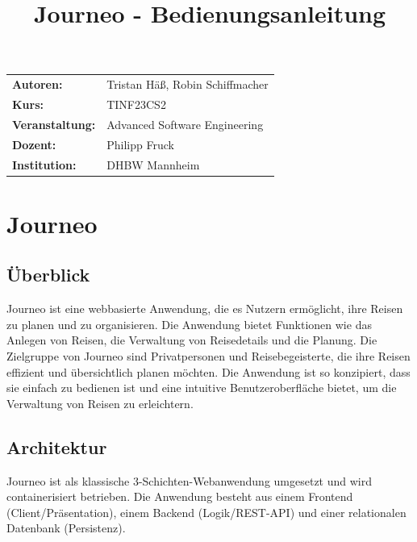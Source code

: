 \documentclass[12pt,a4paper]{article}
\title{\textbf{Journeo - Bedienungsanleitung}}
\date{}
\begin{document}
\maketitle
\thispagestyle{empty}
\onehalfspacing

\begin{center}
    \begin{tabular}{@{}ll@{}}
        \textbf{Autoren:} & Tristan Häß, Robin Schiffmacher\\[1cm]
        \textbf{Kurs:}         & TINF23CS2 \\[1cm]
        \textbf{Veranstaltung:}& Advanced Software Engineering \\[1cm]
        \textbf{Dozent:}       & Philipp Fruck \\[1cm]
        \textbf{Institution:}  & DHBW Mannheim \\[1cm]
    \end{tabular}
\end{center}

\newpage
\tableofcontents

\newpage
\setcounter{page}{1}

\section{Journeo}
\subsection{Überblick}
Journeo ist eine webbasierte Anwendung, die es Nutzern ermöglicht, ihre Reisen zu planen und zu organisieren.
Die Anwendung bietet Funktionen wie das Anlegen von Reisen, die Verwaltung von Reisedetails und die Planung.
Die Zielgruppe von Journeo sind Privatpersonen und Reisebegeisterte, die ihre Reisen effizient und übersichtlich planen möchten.
Die Anwendung ist so konzipiert, dass sie einfach zu bedienen ist und eine intuitive Benutzeroberfläche bietet, um die Verwaltung von Reisen zu erleichtern.



\subsection{Architektur}
Journeo ist als klassische 3-Schichten-Webanwendung umgesetzt und wird containerisiert betrieben.
Die Anwendung besteht aus einem Frontend (Client/Präsentation), einem Backend (Logik/REST-API) und einer relationalen Datenbank (Persistenz).
\end{document}

